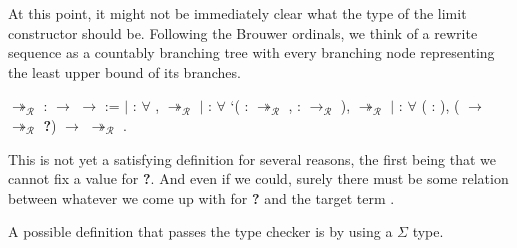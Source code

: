 At this point, it might not be immediately clear what the type of the
limit constructor should be. Following the Brouwer ordinals, we think of a
rewrite sequence as a countably branching tree with every branching node
representing the least upper bound of its branches.
\begin{singlespace}
\begin{coqdoccode}
\coqdocnoindent
{}
$\twoheadrightarrow_\mathcal{R}$ :
 \ensuremath{\rightarrow}
 \ensuremath{\rightarrow}
 :=\coqdoceol
\coqdocindent{1.00em}
\ensuremath{|}    :
\ensuremath{\forall} , 
$\twoheadrightarrow_\mathcal{R}$ \coqdoceol
\coqdocindent{1.00em}
\ensuremath{|}   :
\ensuremath{\forall} `(\coqdocvar{$\rho$} : 
$\twoheadrightarrow_\mathcal{R}$ ,
\coqdocvar{$\pi$} :  $\rightarrow_\mathcal{R}$ ),
 $\twoheadrightarrow_\mathcal{R}$
\coqdoceol
\coqdocindent{1.00em}
\ensuremath{|}    :
\ensuremath{\forall} (  :
),
(
\ensuremath{\rightarrow}  $\twoheadrightarrow_\mathcal{R}$
\textbf{?}) $\rightarrow$
 $\twoheadrightarrow_\mathcal{R}$
.\coqdoceol
\end{coqdoccode}
\end{singlespace}

This is not yet a satisfying definition for several reasons, the first being
that we cannot fix a value for \textbf{?}. And even if we could, surely there
must be some relation between whatever we come up with for \textbf{?} and the
target term .

A possible definition that passes the type checker is by using a $\Sigma$
type.

